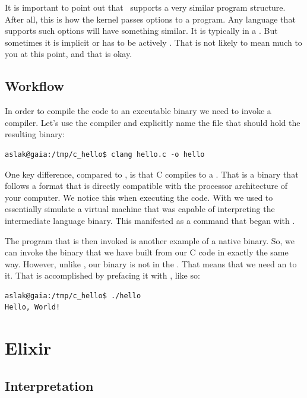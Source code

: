 It is important to point out that \csharp\ supports a very similar program structure. After all, this is how the kernel passes options to a program. Any language that supports such options will have something similar. It is typically in a . But sometimes it is implicit or has to be actively . That is not likely to mean much to you at this point, and that is okay.

\subsection{Workflow}

In order to compile the code to an executable binary we need to invoke a compiler. Let's use the  compiler and explicitly name the file that should hold the resulting binary:

\begin{verbatim}
aslak@gaia:/tmp/c_hello$ clang hello.c -o hello
\end{verbatim}

One key difference, compared to \csharp, is that C compiles to a . That is a binary that follows a format that is directly compatible with the processor architecture of your computer. We notice this when executing the code. With \csharp we used  to essentially simulate a virtual machine that was capable of interpreting the intermediate language binary. This manifested as a command that began with .

The  program that is then invoked is another example of a native binary. So, we can invoke the binary that we have built from our C code in exactly the same way. However, unlike , our binary is not in the . That means that we need an  to it. That is accomplished by prefacing it with , like so:

\begin{verbatim}
aslak@gaia:/tmp/c_hello$ ./hello
Hello, World!
\end{verbatim}

\section{Elixir}

\subsection{Interpretation}

